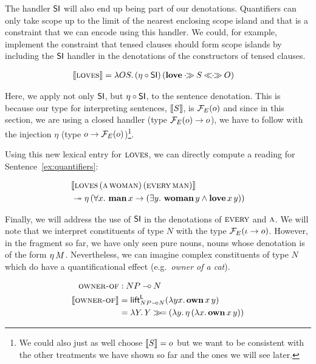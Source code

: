 The handler $\textsf{SI}$ will also end up being part of our
denotations. Quantifiers can only take scope up to the limit of the nearest
enclosing scope island and that is a constraint that we can encode using
this handler. We could, for example, implement the constraint that tensed
clauses should form scope islands by including the $\textsf{SI}$ handler in the
denotations of the constructors of tensed clauses.

\begin{align*}
  \llbracket \textsc{loves} \rrbracket &= \lambda O S.\, (\eta \circ \textsf{SI})\,(\textbf{love} \mathbin{\cdot\!\!\gg} S \mathbin{\ll\!\!\cdot\!\!\gg} O)
\end{align*}

Here, we apply not only $\textsf{SI}$, but $\eta \circ \textsf{SI}$, to the sentence
denotation. This is because our type for interpreting sentences, $\llbracket S \rrbracket$,
is $\mathcal{F}_E(o)$ and since in this section, we are using a closed handler
(type $\mathcal{F}_E(o) \to o$), we have to follow with the injection $\eta$ (type
$o \to \mathcal{F}_E(o)$)\footnote{We could also just as well choose $\llbracket S \rrbracket = o$
  but we want to be consistent with the other treatments we have shown so
  far and the ones we will see later.}.

Using this new lexical entry for $\textsc{loves}$, we can directly compute a
reading for Sentence~\ref{ex:quantifiers}:

\addtocounter{equation}{-1}
\NoChapterPrefix
\begin{align}
& \sem{\app{\abs{loves}}{(\ap{\abs{a}}{\abs{woman}})}{(\ap{\abs{every}}{\abs{man}})}} \nonumber \\
&\tto \etaE{(\forall x.\ \ap{\obj{man}}{x} \to (\exists y.\ \ap{\obj{woman}}{y} \land \app{\obj{love}}{x}{y}))}
\end{align}
\ChapterPrefix

Finally, we will address the use of $\textsf{SI}$ in the denotations of
$\textsc{every}$ and $\textsc{a}$. We will note that we interpret constituents of
type $N$ with the type $\mathcal{F}_E(\iota \to o)$. However, in the fragment so
far, we have only seen pure nouns, nouns whose denotation is of the form
$\eta\,M$. Nevertheless, we can imagine complex constituents of type $N$
which do have a quantificational effect (e.g.\ \emph{owner of a cat}).

\begin{align*}
  \textsc{owner-of} &: NP \mathbin{{-}\mkern-3.5mu{\circ}} N \\
  \llbracket \textsc{owner-of} \rrbracket &= \textsf{lift}^{\textsf{L}}_{NP \mathbin{{-}\mkern-3.5mu{\circ}} N}(\lambda y x.\, \textbf{own}\,x\,y) \\
  &= \lambda Y.\, Y \mathbin{\gg\!=} (\lambda y.\, \eta\,(\lambda x.\, \textbf{own}\,x\,y))
\end{align*}

